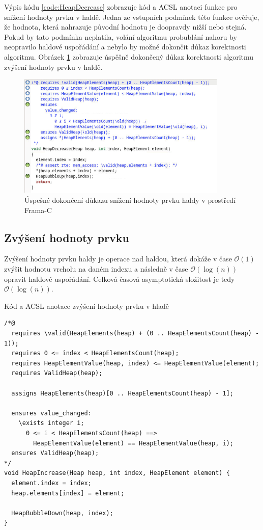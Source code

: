 Výpis kódu \ref{code:HeapDecrease} zobrazuje kód a ACSL anotaci funkce pro snížení hodnoty prvku v haldě. Jedna ze vstupních podmínek této funkce ověřuje, že hodnota, která nahrazuje původní hodnotu je doopravdy nižší nebo stejná. Pokud by tato podmínka neplatila, volání algoritmu probublání nahoru by neopravilo haldové uspořádání a nebylo by možné dokončit důkaz korektnosti algoritmu. Obrázek \ref{img:F-C-HeapDecrease} zobrazuje úspěšně dokončený důkaz korektnosti algoritmu zvýšení hodnoty prvku v haldě.

\begin{figure}[H]
	\centering
	\includegraphics[width=10cm]{images/frama-c-HeapDecrease}
	\caption{Úspešné dokončení důkazu snížení hodnoty prvku haldy v prostředí Frama-C}
	\label{img:F-C-HeapDecrease}
\end{figure}


\subsection{Zvýšení hodnoty prvku}
\label{subsec:HeapIncrease}

Zvýšení hodnoty prvku haldy je operace nad haldou, která dokáže v čase $\mathcal{O}(1)$ zvýšit hodnotu vrcholu na daném indexu a následně v čase $\mathcal{O}(\log(n))$ opravit haldové uspořádání. Celková časová asymptotická složitost je tedy $\mathcal{O}(\log(n))$.

\begin{listing}[H]
	\caption{Kód a ACSL anotace zvýšení hodnoty prvku v hladě}
	\label{code:HeapIncrease}
	\begin{verbatim}
/*@
  requires \valid(HeapElements(heap) + (0 .. HeapElementsCount(heap) - 1));
  requires 0 <= index < HeapElementsCount(heap);
  requires HeapElementValue(heap, index) <= HeapElementValue(element);
  requires ValidHeap(heap);

  assigns HeapElements(heap)[0 .. HeapElementsCount(heap) - 1];

  ensures value_changed:
    \exists integer i;
      0 <= i < HeapElementsCount(heap) ==>
        HeapElementValue(element) == HeapElementValue(heap, i);
  ensures ValidHeap(heap);
*/
void HeapIncrease(Heap heap, int index, HeapElement element) {
  element.index = index;
  heap.elements[index] = element;

  HeapBubbleDown(heap, index);
}
	\end{verbatim}
\end{listing}

